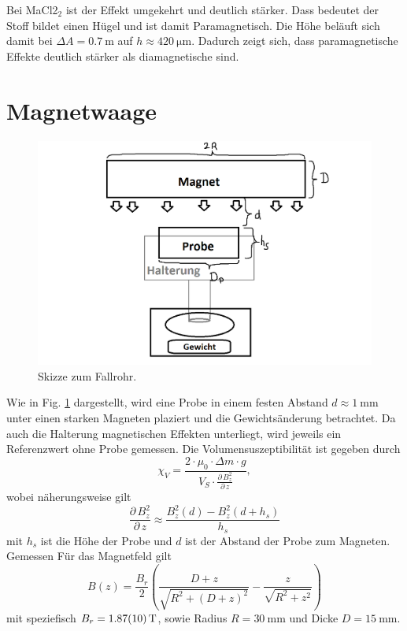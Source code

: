 \documentclass[11pt,a4paper,titlepage, ngerman]{article}
\newcommand{\reffig}[1]{Fig. \ref{fig:#1}}
\begin{document}
	Bei MaCl2$_2$ ist der Effekt umgekehrt und deutlich stärker.
	Dass bedeutet der Stoff bildet einen Hügel und ist damit Paramagnetisch.
	Die Höhe beläuft sich damit bei $\Delta A = \SI{0,7}{\meter}$ auf $h \approx \SI{420}{\micro\meter}$.
	Dadurch zeigt sich, dass paramagnetische Effekte deutlich stärker als diamagnetische sind.
	
	\section{Magnetwaage}
	\begin{figure}[ht]
		\includegraphics[width=\textwidth]{SkizzeMagnetwaage.png}
		\caption{Skizze zum Fallrohr.}
		\label{fig:magnetwaage}
	\end{figure}
	Wie in \reffig{magnetwaage} dargestellt, wird eine Probe in einem festen Abstand $d\approx\SI{1}{\milli\meter}$ unter einen starken Magneten plaziert und die Gewichtsänderung betrachtet.
	Da auch die Halterung magnetischen Effekten unterliegt, wird jeweils ein Referenzwert ohne Probe gemessen.
	Die Volumensuszeptibilität ist gegeben durch
	\begin{equation}
		\chi_V = \frac{2 \cdot \mu_0 \cdot \Delta m \cdot g}{V_S \cdot \frac{\partial\,B^2_z}{\partial\,z}},
	\end{equation}
	wobei näherungsweise gilt
	\begin{equation}
		\frac{\partial\,B^2_z}{\partial\,z} \approx \frac{B_z^2(d) - B_z^2(d+h_s)}{h_s}
	\end{equation}
	mit $h_s$ ist die Höhe der Probe und $d$ ist der Abstand der Probe zum Magneten.
	Gemessen 
	Für das Magnetfeld gilt
	\begin{equation}
		B(z) = \frac{B_r}{2}\left( \frac{D+z}{\sqrt{R^2 + (D+z)^2}} - \frac{z}{\sqrt{R^2 + z^2}}\right)
	\end{equation}
	mit speziefisch $B_r = \SI{1,87+-0,1}{T}$, sowie Radius $R = \SI{30}{\milli\meter}$ und Dicke $D = \SI{15}{\milli\meter}$.
	
\end{document}
